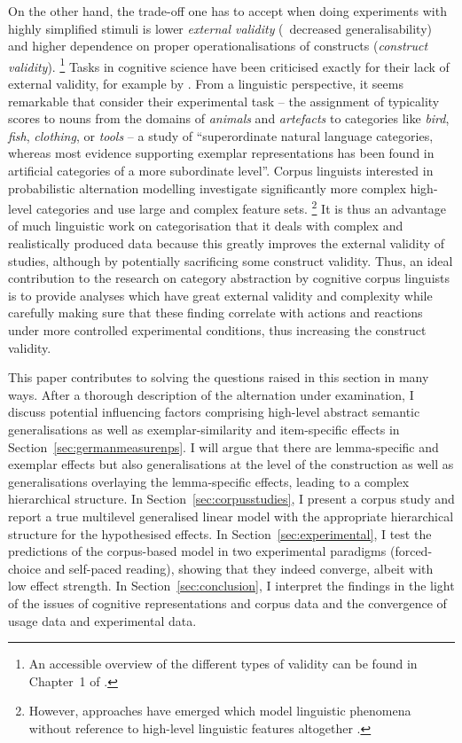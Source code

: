 On the other hand, the trade-off one has to accept when doing experiments with highly simplified stimuli is lower \textit{external validity} (\ie\ decreased generalisability) and higher dependence on proper operationalisations of constructs (\textit{construct validity}).%
\footnote{An accessible overview of the different types of validity can be found in Chapter~1 of \citet{MaxwellDelaney2004}.}
Tasks in cognitive science have been criticised exactly for their lack of external validity, for example by \citet{Murphy2003}.
From a linguistic perspective, it seems remarkable that \citet[1013]{VoorspoelsEa2011} consider their experimental task -- the assignment of typicality scores to nouns from the domains of \textit{animals} and \textit{artefacts} to categories like \textit{bird}, \textit{fish}, \textit{clothing}, or \textit{tools} -- a study of ``superordinate natural language categories, whereas most evidence supporting exemplar representations has been found in artificial categories of a more subordinate level''.
Corpus linguists interested in probabilistic alternation modelling investigate significantly more complex high-level categories and use large and complex feature sets.%
\footnote{However, approaches have emerged which model linguistic phenomena without reference to high-level linguistic features altogether \citep{BaayenEa2016,RamscarPort2016}.}
It is thus an advantage of much linguistic work on categorisation that it deals with complex and realistically produced data because this greatly improves the external validity of studies, although by potentially sacrificing some construct validity.
Thus, an ideal contribution to the research on category abstraction by cognitive corpus linguists is to provide analyses which have great external validity and complexity while carefully making sure that these finding correlate with actions and reactions under more controlled experimental conditions, thus increasing the construct validity.

This paper contributes to solving the questions raised in this section in many ways.
After a thorough description of the alternation under examination, I discuss potential influencing factors comprising high-level abstract semantic generalisations as well as exemplar-similarity and item-specific effects in Section~\ref{sec:germanmeasurenps}.
I will argue that there are lemma-specific and exemplar effects but also generalisations at the level of the construction as well as generalisations overlaying the lemma-specific effects, leading to a complex hierarchical structure.
In Section~\ref{sec:corpusstudies}, I present a corpus study and report a true multilevel generalised linear model with the appropriate hierarchical structure for the hypothesised effects.
In Section~\ref{sec:experimental}, I test the predictions of the corpus-based model in two experimental paradigms (forced-choice and self-paced reading), showing that they indeed converge, albeit with low effect strength.
In Section~\ref{sec:conclusion}, I interpret the findings in the light of the issues of cognitive representations and corpus data and the convergence of usage data and experimental data.

